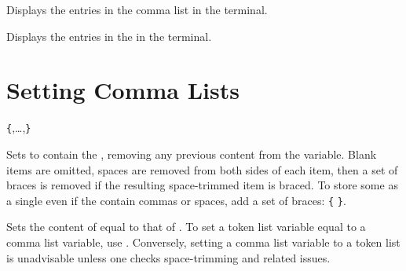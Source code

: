 \documentclass[oneside]{book}
\begin{document}
\begin{function}{\ClistShow}
\begin{syntax}
 
\end{syntax}
Displays the entries in the comma list in the terminal.
\begin{codehigh}
\end{codehigh}
\end{function}

\begin{function}{\ClistVarShow}
\begin{syntax}
 
\end{syntax}
Displays the entries in the  in the terminal.
\begin{codehigh}
\ClistSet {}
\ClistVarShow \lTmpaClist
\end{codehigh}
\end{function}

\section{Setting Comma Lists}

\begin{function}{\ClistSet}
\begin{syntax}
  \verb|{|,\ldots{},\verb|}|
\end{syntax}
Sets  to contain the ,
removing any previous content from the variable.
Blank items are omitted, spaces are removed from both sides of each
item, then a set of braces is removed if the resulting space-trimmed
item is braced.
To store some  as a single  even if the
 contain commas or spaces, add a set of braces:
  \verb|{|  \verb|}|.
\begin{demohigh}
\ClistSet {}
\ClistVarJoin {}
\end{demohigh}
\end{function}

\begin{function}{\ClistSetEq}
\begin{syntax}
  
\end{syntax}
Sets the content of  equal to that of
.  To set a token list variable equal to a comma
list variable, use .  Conversely, setting a comma
list variable to a token list is unadvisable unless one checks
space-trimming and related issues.
\begin{demohigh}
\ClistSet {}
\ClistSetEq \lTmpbClist \lTmpaClist
\ClistVarJoin {}
\end{demohigh}
\end{function}
\end{document}
